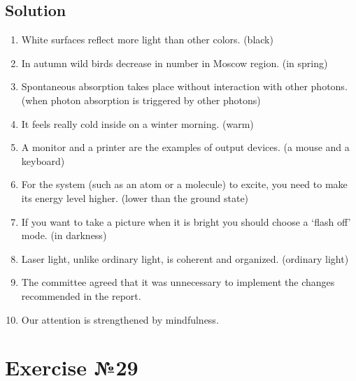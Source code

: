 \subsection*{Solution}
\begin{enumerate}
      \item White surfaces reflect more light than other colors. (black)
      \item In autumn wild birds decrease in number in Moscow region. (in spring)
      \item Spontaneous absorption takes place without interaction with other photons.
            (when photon absorption is triggered by other photons)
      \item It feels really cold inside on a winter morning. (warm)
      \item A monitor and a printer are the examples of output devices. (a mouse and
            a keyboard)
      \item For the system (such as an atom or a molecule) to excite, you need to make
            its energy level higher. (lower than the ground state)
      \item If you want to take a picture when it is bright you should choose a ‘flash
            off’ mode. (in darkness)
      \item Laser light, unlike ordinary light, is coherent and organized. (ordinary
            light)
      \item The committee agreed that it was unnecessary to implement the changes
            recommended in the report.
      \item Our attention is strengthened by mindfulness.
\end{enumerate}

\section{Exercise №29}
